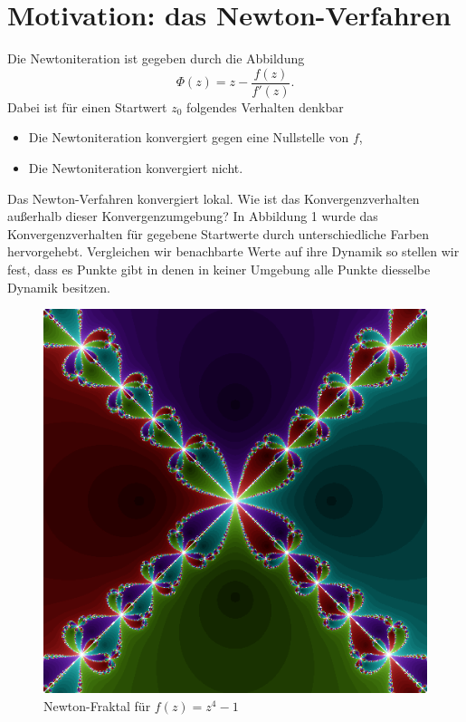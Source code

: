 \documentclass{mywork}
\begin{document}
\section{Motivation: das Newton-Verfahren}

Die Newtoniteration ist gegeben durch die Abbildung
\[
	\Phi(z)=z-\frac{f(z)}{f'(z)}.
\]
Dabei ist für einen Startwert $z_0$ folgendes Verhalten denkbar
\begin{itemize}
\item Die Newtoniteration konvergiert gegen eine Nullstelle von $f$,
\item Die Newtoniteration konvergiert nicht.
\end{itemize}

Das Newton-Verfahren konvergiert lokal. Wie ist das Konvergenzverhalten außerhalb dieser Konvergenzumgebung? In Abbildung 1 wurde das Konvergenzverhalten für gegebene Startwerte durch unterschiedliche Farben hervorgehebt. Vergleichen wir benachbarte Werte auf ihre Dynamik so stellen wir fest, dass es Punkte gibt in denen in keiner Umgebung alle Punkte diesselbe Dynamik besitzen.


\begin{figure}[H]
\centering
\includegraphics[scale=0.25]{fraktal.png}
\caption{Newton-Fraktal für $f(z)=z^4-1$}
\end{figure}
\end{document}
